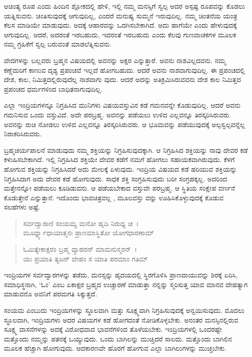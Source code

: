 ಅಚಿಂತ್ಯ ರೂಪ ಎಂದು ಹಿಂದಿನ ಶ್ಲೋಕದಲ್ಲಿ ಹೇಳಿ, ಇಲ್ಲಿ ನಮ್ಮ ಮನಸ್ಸಿಗೆ ಸ್ವಲ್ಪ ಅದರ ಅಸ್ಪಷ್ಟ ರೂಪವನ್ನು ಕೊಡಲು ಯತ್ನಿಸುವನು. ಚಿಂತಿಸುವುದಕ್ಕೆ ಆಗುವುದಿಲ್ಲ, ಎಂದರೆ ಮನುಷ್ಯ ಸುಮ್ಮನೆ ಇರುವುದಿಲ್ಲ. ನಮ್ಮ ಚಿಂತನೆಯ ಯಂತ್ರ ಕೆಲಸ ಮಾಡಿಯೇ ಮಾಡುವುದು. ಅದಕ್ಕೆ ಆಹಾರವನ್ನು ಒದಗಿಸಬೇಕಾಗಿದೆ. ಅದು ಹಾಗೆಯೇ ಎಂದು ಹೇಳುವುದಕ್ಕೆ ಆಗುವುದಿಲ್ಲ. ಆದರೆ, ಅದರಂತೆ ಇರಬಹುದು, ಇದರಂತೆ ಇರಬಹುದು ಎಂದು ಕೆಲವು ಗುಣವಾಚಕಗಳ ಮೂಲಕ ನಮ್ಮ ಗ್ರಹಿಕೆಗೆ ಸ್ವಲ್ಪ ಬರುವಂತೆ ಮಾಡಲೆತ್ನಿಸುವನು.

ವೇದಗಳನ್ನು ಬಲ್ಲವರು ಬ್ರಹ್ಮನ ವಿಷಯದಲ್ಲಿ ಅವನನ್ನು ಅಕ್ಷರ ಎನ್ನುತ್ತಾರೆ. ಅವನು ನಾಶವಿಲ್ಲದವನು. ನಮ್ಮ ಕಣ್ಣೆದುರಿಗೆ ಕಾಣುವ ದೃಶ್ಯ ಪ್ರಪಂಚವೆ ಇಲ್ಲದೆ ಹೋಗಬಹುದು. ಆದರೆ ಅವನು ನಾಶವಾಗುವುದಿಲ್ಲ. ಈ ಪ್ರಪಂಚದಲ್ಲಿ ದೇಶ, ಕಾಲ, ನಿಮಿತ್ತದಲ್ಲಿರುವುದೆಲ್ಲ ನಾಶವಾಗು ವುದು. ಆದರೆ ಅದನ್ನು ಅತಿಕ್ರಮಿಸಿರುವವನು ದೇಶ ಕಾಲ ನಿಮಿತ್ತದ ಪ್ರಪಂಚದ ಧರ್ಮಗಳಿಂದ ಬಾಧಿತನಾಗುವುದಿಲ್ಲ.

ಎಲ್ಲಾ ಇಂದ್ರಿಯಗಳನ್ನೂ ನಿಗ್ರಹಿಸಿದ ಮುನಿಗಳು ವಿಷಯವಸ್ತುವಿನ ಕಡೆ ಗಮನವನ್ನೇ ಕೊಡುವುದಿಲ್ಲ. ಆದರೆ ಅವನು ಗಮನಿಸುವ ಒಂದು ವಸ್ತುವಿದೆ. ಅದೇ ಪರಬ್ರಹ್ಮ. ಅವನನ್ನು ಪಡೆಯಲು ಉಳಿದ ಎಲ್ಲವನ್ನೂ ತಿರಸ್ಕರಿಸಿರುವರು. ಅವನನ್ನು ರುಚಿ ನೋಡಲು ಉಳಿದ ಎಲ್ಲವನ್ನೂ ತಿರಸ್ಕರಿಸಿರುವರು. ಆ ಭೂಮವನ್ನು ಪಡೆಯುವುದಕ್ಕೆ ಅಲ್ಪಸ್ವಲ್ಪವನ್ನೆಲ್ಲ ನಿರಾಕರಿಸಿರುವರು.

ಬ್ರಹ್ಮಚರ್ಯಪಾಲನೆ ಮಾಡುವುದು ನಮ್ಮ ಶಕ್ತಿಯನ್ನು ನಿಗ್ರಹಿಸುವುದಕ್ಕಾಗಿ. ಆ ನಿಗ್ರಹಿಸಿದ ಶಕ್ತಿಯನ್ನು ನಾವು ದೇವರ ಕಡೆ ಕಳುಹಿಸಬೇಕಾಗಿದೆ. ಇಲ್ಲಿ ನಿಗ್ರಹಿಸಿದ ಶಕ್ತಿಯೇ ದೇವರ ಕಡೆಗೆ ನಮಗೆ ಹೋಗಲು ಸಹಾಯಕವಾಗಿರುವುದು. ಕೆಳಗೆ ಹೋಗುವ ಶಕ್ತಿಯನ್ನು ನಿಗ್ರಹಿಸಿದರೆ ಅದು ಮೇಲಕ್ಕೆ ಏಳುವುದು. ಇಂದ್ರಿಯ ವಿಷಯದ ಕಡೆ ಹರಿಯುವ ಶಕ್ತಿಯನ್ನು ನಿಗ್ರಹಿಸಿದಾಗ ಅದು ದೇವರ ಕಡೆ ಹೋಗುವುದು. ಸಾಧಕ ಶಕ್ತಿ ಸಂಗ್ರಹಿಸುವುದು ಬರೀ ಸಂಗ್ರಹಕ್ಕಲ್ಲ. ಅದರಿಂದ ಮತ್ತೇನನ್ನೋ ಪಡೆಯಲು ಕೂಡಿಡುವನು. ಆ ಪಡೆಯಬೇಕಾದ ವಸ್ತುವೇ ಪರಬ್ರಹ್ಮ. ಆ ಸ್ಥಿತಿಯ ಸಂಕ್ಷೇಪ ವರ್ಣನೆ ಕೊಡುತ್ತೇನೆ ಎನ್ನುತ್ತಾನೆ. ಇದೊಂದು ಭಾವಚಿತ್ರವಲ್ಲ , ಮೂಲವಸ್ತು ವನ್ನು ಊಹಿಸಿಕೊಳ್ಳುವುದಕ್ಕೆ ಕೊಡುವ ಸಲಹೆಗಳು ಅಷ್ಟೆ.

\begin{verse}
ಸರ್ವದ್ವಾರಾಣಿ ಸಂಯಮ್ಯ ಮನೋ ಹೃದಿ ನಿರುಧ್ಯ ಚ~।\\ಮೂರ್ಧ್ನ್ಯಾಧಾಯಾತ್ಮನಃ ಪ್ರಾಣಮಾಸ್ಥಿತೋ ಯೋಗಧಾರಣಾಮ್ 
\end{verse}

\begin{verse}
ಓಮಿತ್ಯೇಕಾಕ್ಷರಂ ಬ್ರಹ್ಮ ವ್ಯಾಹರನ್ ಮಾಮನುಸ್ಮರನ್~।\\ಯಃ ಪ್ರಯಾತಿ ತ್ಯಜನ್ ದೇಹಂ ಸ ಯಾತಿ ಪರಮಾಂ ಗತಿಮ್ 
\end{verse}

{\small ಇಂದ್ರಿಯಗಳ ಸರ್ವದ್ವಾರಗಳನ್ನು ತಡೆದು, ಮನಸ್ಸನ್ನು ಹೃದಯದಲ್ಲಿ ಸ್ಥಿರಗೊಳಿಸಿ ಪ್ರಾಣವಾಯುವನ್ನು ಶಿರಕ್ಕೆ ಏರಿಸಿ, ಸಮಾಧಿಸ್ಥನಾಗಿ, ‘ಓಂ’ ಎಂಬ ಏಕಾಕ್ಷರ ಬ್ರಹ್ಮದ ಉಚ್ಚಾರಣೆ ಮಾಡುತ್ತಾ ನನ್ನನ್ನು ಸ್ಮರಿಸುತ್ತ ಯಾವ ಮಾನವ ದೇಹತ್ಯಾಗ ಮಾಡುವನೊ ಅವನಿಗೆ ಪರಮಗತಿ ಸಿಕ್ಕುತ್ತದೆ.}

ಸಂಯಮ ಎಂಬುದು ಇಂದ್ರಿಯಗಳನ್ನು ಸ್ಥೂಲವಾಗಿ ಮತ್ತು ಸೂಕ್ಷ್ಮವಾಗಿ ನಿಗ್ರಹಿಸುವುದಕ್ಕೆ ಅನ್ವಯಿಸುವುದು. ಮೊದಲು ಸ್ಥೂಲವಾಗಿ, ಇಂದ್ರಿಯಗಳು ಅದರ ವಿಷಯಗಳ ಕಡೆ ಹೋಗದಂತೆ ನೋಡಿಕೊಳ್ಳಬೇಕು. ಅನಂತರ ಮನಸ್ಸಿನಲ್ಲಿರುವ ಸೂಕ್ಷ್ಮ ವಾಸನೆಗಳನ್ನು ಅದಕ್ಕೆ ವಿರೋಧವಾದ ಭಾವನೆಗಳಿಂದ ತೊಳೆಯಬೇಕು. ಇಂದ್ರಿಯಗಳಲ್ಲಿ ಒಂದರಷ್ಟೇ ಮತ್ತೊಂದು ನಮ್ಮನ್ನು ಪತನಕ್ಕೆ ಒಯ್ಯುವುದು. ಒಂದು ಬಾಗಿಲನ್ನು ಮುಚ್ಚಿದರೆ ಸಾಲದು. ಮತ್ತೊಂದು ಬಾಗಿಲಿನ ಮೂಲಕ ಹೆಚ್ಚಾಗಿ ಹೋಗುವುದು. ಆದಕಾರಣವೇ ಹೊರಗೆ ಹೋಗುವ ಎಲ್ಲಾ ಬಾಗಿಲುಗಳನ್ನು ಮುಚ್ಚಬೇಕು.

